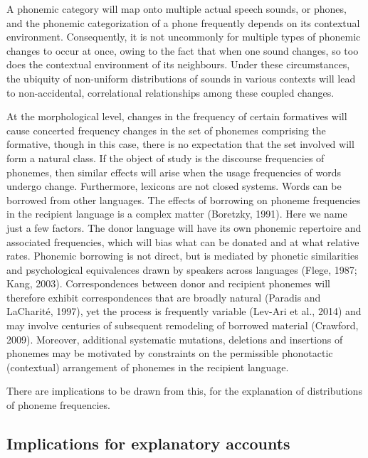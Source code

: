 A phonemic category will map onto multiple actual speech sounds, or phones, and the phonemic categorization of a phone frequently depends on its contextual environment. Consequently, it is not uncommonly for multiple types of phonemic changes to occur at once, owing to the fact that when one sound changes, so too does the contextual environment of its neighbours. Under these circumstances, the ubiquity of non-uniform distributions of sounds in various contexts will lead to non-accidental, correlational relationships among these coupled changes.

At the morphological level, changes in the frequency of certain formatives will cause concerted frequency changes in the set of phonemes comprising the formative, though in this case, there is no expectation that the set involved will form a natural class. If the object of study is the discourse frequencies of phonemes, then similar effects will arise when the usage frequencies of words undergo change. Furthermore, lexicons are not closed systems. Words can be borrowed from other languages. The effects of borrowing on phoneme frequencies in the recipient language is a complex matter (Boretzky, 1991). Here we name just a few factors. The donor language will have its own phonemic repertoire and associated frequencies, which will bias what can be donated and at what relative rates. Phonemic borrowing is not direct, but is mediated by phonetic similarities and psychological equivalences drawn by speakers across languages (Flege, 1987; Kang, 2003). Correspondences between donor and recipient phonemes will therefore exhibit correspondences that are broadly natural (Paradis and LaCharité, 1997), yet the process is frequently variable (Lev-Ari et al., 2014) and may involve centuries of subsequent remodeling of borrowed material (Crawford, 2009). Moreover, additional systematic mutations, deletions and insertions of phonemes may be motivated by constraints on the permissible phonotactic (contextual) arrangement of phonemes in the recipient language.

There are implications to be drawn from this, for the explanation of distributions of phoneme frequencies. \newline

\hypertarget{implications-for-explanatory-accounts}{%
\subsection*{Implications for explanatory accounts}\label{implications-for-explanatory-accounts}}

